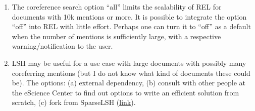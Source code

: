 \documentclass[a4paper,11pt]{article}
\numberwithin{equation}{section} %
\begin{document}
\begin{enumerate}
 \item The coreference search option ``all'' limits the scalability of REL for documents with 10k mentions or more. It is possible to integrate the option ``off'' into REL with little effort. Perhaps one can turn it to ``off'' as a default when the number of mentions is sufficiently large, with a respective warning/notification to the user. 
 \item LSH may be useful for a use case with large documents with possibly many coreferring mentions (but I do not know what kind of documents these could be). The options: (a) external dependency, (b) consult with other people at the eScience Center to find out options to write an efficient solution from scratch, (c) fork from SparseLSH (\href{https://github.com/brandonrobertz/SparseLSH}{\underline{link}}).

\end{enumerate}








\end{document}
